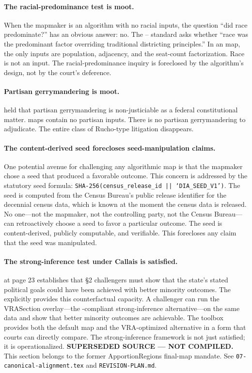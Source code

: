 \paragraph{The racial-predominance test is moot.}
When the mapmaker is an algorithm with no racial inputs, the question
``did race predominate?'' has an obvious answer: no.
The \shaw{}--\miller{} standard asks whether ``race was the predominant factor
overriding traditional districting principles.''
In an \ar{} map, the only inputs are population, adjacency, and the seat-count
factorization.
Race is not an input.
The racial-predominance inquiry is foreclosed by the algorithm's design,
not by the court's deference.

\paragraph{Partisan gerrymandering is moot.}
\rucho{} held that partisan gerrymandering is non-justiciable as a federal
constitutional matter.
\ar{} maps contain no partisan inputs.
There is no partisan gerrymandering to adjudicate.
The entire class of Rucho-type litigation disappears.

\paragraph{The content-derived seed forecloses seed-manipulation claims.}
One potential avenue for challenging any algorithmic map is that the
mapmaker chose a seed that produced a favorable outcome.
This concern is addressed by the statutory seed formula:
\texttt{SHA-256(census\_release\_id || `DIA\_SEED\_V1')}.
The seed is computed from the Census Bureau's public release identifier
for the decennial census data, which is known at the moment the census
data is released.
No one---not the mapmaker, not the controlling party, not the Census Bureau---
can retroactively choose a seed to favor a particular outcome.
The seed is content-derived, publicly computable, and verifiable.
This forecloses any claim that the seed was manipulated.

\paragraph{The strong-inference test under Callais is satisfied.}
\callais{} at page 23 establishes that \S2 challengers must show that the
state's stated political goals could have been achieved with better minority
outcomes.
The \dia{} explicitly provides this counterfactual capacity.
A challenger can run the VRASection overlay---the \callais{}-compliant
strong-inference alternative---on the same data and show that better minority
outcomes are achievable.
The toolbox provides both the default map and the VRA-optimized alternative
in a form that courts can directly compare.
The \callais{} strong-inference framework is not just satisfied; it is operationalized.
\noindent\textbf{SUPERSEDED SOURCE --- NOT COMPILED.} This section belongs to
the former ApportionRegions final-map mandate. See
\texttt{07-canonical-alignment.tex} and \texttt{REVISION-PLAN.md}.
